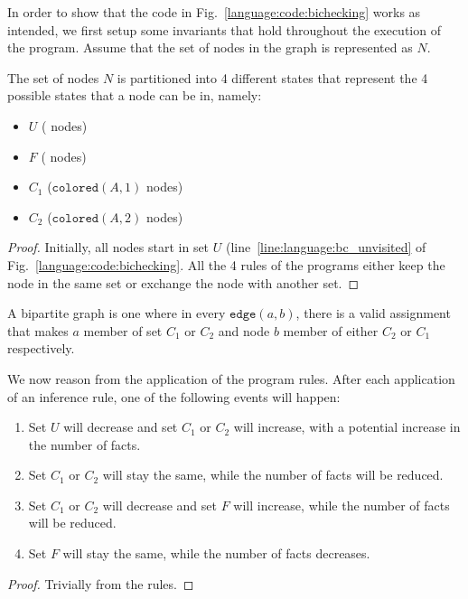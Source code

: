 In order to show that the code in Fig.~\ref{language:code:bichecking} works as
intended, we first setup some invariants that hold throughout the execution of
the program. Assume that the set of nodes in the graph is represented as $N$.

\begin{invariant}
The set of nodes $N$ is partitioned into 4 different states that represent the 4
possible states that a node can be in, namely:

\begin{itemize}
   \item $U$ ( nodes)
   \item $F$ ( nodes)
   \item $C_{1}$ ($\mathtt{colored}(A, 1)$ nodes)
   \item $C_{2}$ ($\mathtt{colored}(A, 2)$ nodes)
\end{itemize}
\end{invariant}
\begin{proof}
Initially, all nodes start in set $U$ (line~\ref{line:language:bc_unvisited}
of Fig.~\ref{language:code:bichecking}. All the 4 rules of the programs either
keep the node in the same set or exchange the node with another set.
\end{proof}

A bipartite graph is one where in every $\mathtt{edge}(a, b)$, there is a valid
   assignment that makes $a$ member of set $C_{1}$ or $C_{2}$ and node
   $b$ member of either $C_{2}$ or $C_{1}$ respectively.

\begin{variant}\label{language:lemma:bipartite_convergence}

   We now reason from the application of the program rules. After each
   application of an inference rule, one of the following events will happen:

   \begin{enumerate}
      \item Set $U$ will decrease and set $C_{1}$ or $C_{2}$ will
         increase, with a potential increase in the number of 
         facts.

      \item Set $C_{1}$ or $C_{2}$ will stay the same, while the number
         of  facts will be reduced.

      \item Set $C_{1}$ or $C_{2}$ will decrease and set $F$ will
         increase, while the number of  facts will be reduced.

      \item Set $F$ will stay the same, while the number of  facts
         decreases.
   \end{enumerate}

\end{variant}
\begin{proof}
Trivially from the rules.
\end{proof}

